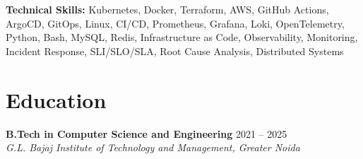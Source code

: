 \documentclass[11pt, letterpaper]{article}
\begin{document}
\vspace{2pt}
\begin{list}{}{%
    \setlength{\leftmargin}{0pt}%
    \setlength{\itemindent}{0pt}%
    \setlength{\labelwidth}{0pt}%
    \setlength{\labelsep}{0pt}%
    \setlength{\topsep}{2pt}%
    \setlength{\itemsep}{2pt}%
    \setlength{\parsep}{0pt}%
}
    \item \textbf{Technical Skills:} Kubernetes,\hspace{2pt} Docker,\hspace{2pt} Terraform,\hspace{2pt} AWS,\hspace{2pt} GitHub Actions,\hspace{2pt} ArgoCD,\hspace{2pt} GitOps,\hspace{2pt} Linux,\hspace{2pt} CI/CD,\hspace{2pt} Prometheus,\hspace{2pt} Grafana,\hspace{2pt} Loki,\hspace{2pt} OpenTelemetry,\hspace{2pt} Python,\hspace{2pt} Bash,\hspace{2pt} MySQL,\hspace{2pt} Redis,\hspace{2pt} Infrastructure as Code,\hspace{2pt} Observability,\hspace{2pt} Monitoring,\hspace{2pt} Incident Response,\hspace{2pt} SLI/SLO/SLA,\hspace{2pt} Root Cause Analysis,\hspace{2pt} Distributed Systems
\end{list}

\section*{Education}

\vspace{2pt}
\textbf{B.Tech in Computer Science and Engineering} \hfill 2021 -- 2025 \\
\textit{G.L. Bajaj Institute of Technology and Management, Greater Noida}
\end{document}
